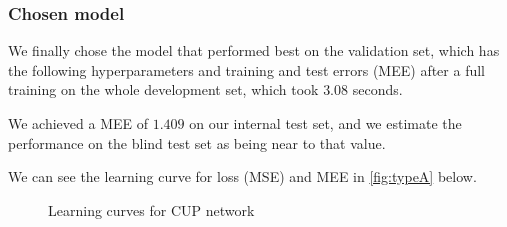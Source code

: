 \subsubsection{Chosen model}
We finally chose the model that performed best on the validation set, which has the following hyperparameters and training and test errors (MEE) after a full training on the whole development set, which took $3.08$ seconds.

\begin{table}[htb]
    \centering
    \caption{Hyperparameters and training and test error of the chosen model after a full training on the whole development set}
    \label{table:final_train_results}
\end{table}
We achieved a MEE of $1.409$ on our internal test set, and we estimate the performance on the blind test set as being near to that value.

We can see the learning curve for loss (MSE) and MEE in \cref{fig:typeA} below.

\begin{figure}[h]
    \centering
    \caption{Learning curves for CUP network}
\end{figure}


